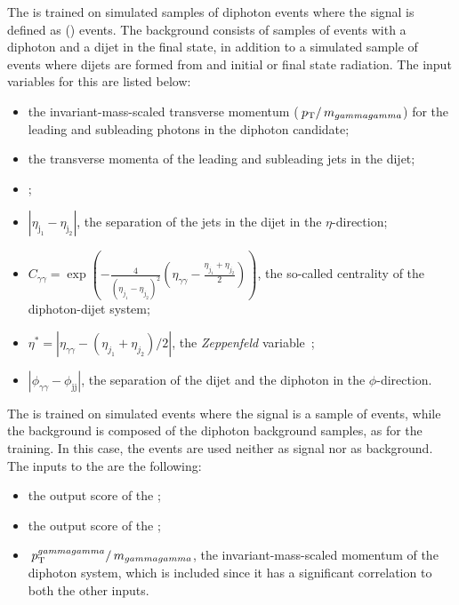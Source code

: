 The \DiJetBdt is trained on simulated samples of diphoton events where the signal is defined as \VBF (\Hgg) events. The background consists of samples of \SM events with a diphoton and a dijet in the final state, in addition to a simulated sample of \ggH events where dijets are formed from \PU and initial or final state radiation. The input variables for this \BDT are listed below:
\begin{itemize}
\item the invariant-mass-scaled transverse momentum ($\,p_\text{T}/\,m_{gammagamma}$) for the leading and subleading photons in the diphoton candidate;
\item the transverse momenta of the leading and subleading jets in the dijet;
\item \mjj;
\item $|\eta_{\text{j}_1} - \eta_{\text{j}_2}|$, the separation of the jets in the dijet in the $\eta$-direction;
\ifNewAnalysis
\item $C_{\gamma\gamma} = \exp(-\frac{4}{(\eta_{j_1}-\eta_{j_2})^2}(\eta_{\gamma\gamma}-\frac{\eta_{j_1}+\eta_{j_2}}{2}))$, the so-called centrality of the diphoton-dijet system;
\else
\item $\eta^{*} = |\eta_{\gamma\gamma} - (\eta_{j_1}+\eta_{j_2})/2|$, the \emph{Zeppenfeld} variable~\cite{Zeppenfeld};
\fi
\item $|\phi_{\gamma\gamma} - \phi_\text{jj}|$, the separation of the dijet and the diphoton in the $\phi$-direction.
\end{itemize}


The \DiPhoDiJetBdt is trained on simulated events where the signal is a sample of \VBF \Hgg events, while the background is composed of the \SM diphoton background samples, as for the \DiJetBdt training. In this case, the \ggH events are used neither as signal nor as background. The inputs to the \BDT are the following:
\begin{itemize}
\item the output score of the \DiPhoBdt;
\item the output score of the \DiJetBdt;
\item $\,p_\text{T}^{gammagamma}/\,m_{gammagamma}$, the invariant-mass-scaled momentum of the diphoton system, which is included since it has a significant correlation to both the other inputs.
\end{itemize}

